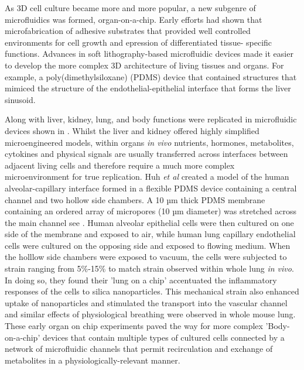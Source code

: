 As 3D cell culture became more and more popular, a new subgenre of microfluidics was formed, organ-on-a-chip. Early efforts had shown
that microfabrication of adhesive substrates that provided well controlled environments for cell growth and epression of differentiated tissue-
specific functions\citep{chen1997geometric,bhatia1999effect}. Advances in soft lithography-based microfluidic devices made it easier
to develop the more complex 3D architecture of living tissues and organs. For example, a poly(dimethylsiloxane) (PDMS) device
that contained structures that mimiced the structure of the endothelial-epithelial interface that forms the liver sinusoid\citep{nakao2011bile}.

Along with liver, kidney, lung, and body functions were replicated in microfluidic devices shown in . Whilst the liver and kidney offered highly
simplified microengineered models, within organs \textit{in vivo} nutrients, hormones, metabolites, cytokines and physical signals are usually transferred across interfaces
between adjacent living cells and therefore require a much more complex microenvironment
for true replication. Huh \textit{et al} created a model of the human alveolar-capillary interface formed in a flexible
PDMS device containing a central channel and two hollow side chambers\citep{huh2010reconstituting}. A 10 µm thick PDMS membrane containing an
ordered array of micropores (10 µm diameter) was stretched across the main channel see . Human alveolar epithelial cells were then cultured on
one side of the membrane and exposed to air, while human lung capillary endothelial cells were cultured on the opposing side and exposed to flowing
medium. When the holllow side chambers were exposed to vacuum, the cells were subjected to strain ranging from 5\%-15\% to match strain observed within
whole lung \textit{in vivo}. In doing so, they found their 'lung on a chip' accentuated the inflammatory responses of the cells to silica
nanoparticles. This mechanical strain also enhanced uptake of nanoparticles and stimulated the transport into the vascular channel and
similar effects of physiological breathing were observed in whole mouse lung. These early organ on chip experiments paved the way for more complex
'Body-on-a-chip' devices that contain multiple types of cultured cells connected by a network of
microfluidic channels that permit recirculation and exchange of metabolites in a physiologically-relevant manner\citep{esch2011role}.



